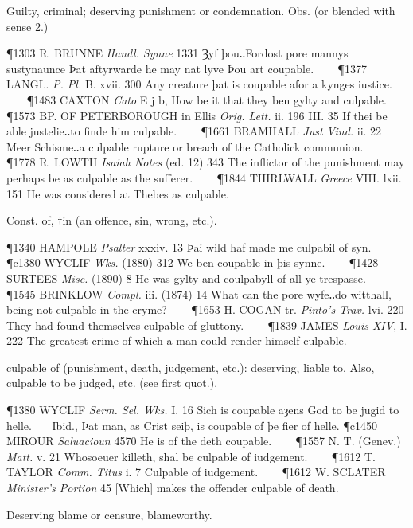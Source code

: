 \begin{description}[wide, labelwidth=!, labelindent=0pt]
\begin{myenumerate}

 Guilty, criminal; deserving punishment or condemnation. Obs. (or blended with sense 2.)

\P 1303 R. BRUNNE  \textit{Handl. Synne} 1331 Ȝyf  þou‥Fordost pore mannys sustynaunce Þat aftyrwarde he may nat lyve Þou art coupable.    
\P 1377 LANGL.  \textit{P. Pl.} B. xvii. 300 Any creature þat is coupable afor a kynges iustice.    
\P 1483 CAXTON  \textit{Cato} E j b, How be it that they ben gylty and culpable.    
\P 1573 BP. OF PETERBOROUGH  in Ellis \textit{Orig. Lett.} ii. 196 III. 35 If thei be able justelie‥to finde him culpable.    
\P 1661 BRAMHALL  \textit{Just Vind.} ii. 22 Meer Schisme‥a culpable rupture or breach of the Catholick communion.    
\P 1778 R. LOWTH  \textit{Isaiah Notes} (ed. 12) 343 The inflictor of the punishment may perhaps be as culpable as the sufferer.    
\P 1844 THIRLWALL  \textit{Greece} VIII. lxii. 151 He was considered at Thebes as culpable.

 Const. of, †in (an offence, sin, wrong, etc.).

\P 1340 HAMPOLE  \textit{Psalter} xxxiv. 13 Þai wild haf made me culpabil of syn.
\P c1380 WYCLIF  \textit{Wks.} (1880) 312 We ben coupable in þis synne.    
\P 1428 SURTEES  \textit{Misc.} (1890) 8 He was gylty and coulpabyll of all ye trespasse.    
\P 1545 BRINKLOW  \textit{Compl.} iii. (1874) 14 What can the pore wyfe‥do witthall, being not culpable in the cryme?    
\P 1653 H. COGAN  tr. \textit{Pinto's Trav.} lvi. 220 They had found themselves culpable of gluttony.    
\P 1839 JAMES  \textit{Louis XIV}, I. 222 The greatest crime of which a man could render himself culpable.

 culpable of (punishment, death, judgement, etc.): deserving, liable to. Also, culpable to be judged, etc. (see first quot.).

\P 1380 WYCLIF  \textit{Serm. Sel. Wks.} I. 16 Sich is coupable aȝens God to be jugid to helle.    Ibid., Þat man, as Crist seiþ, is coupable of þe fier of helle.
\P c1450 MIROUR  \textit{Saluacioun} 4570 He is of the deth coupable.    
\P 1557 N. T. (Genev.)  \textit{Matt.} v. 21 Whosoeuer killeth, shal be culpable of iudgement.    
\P 1612 T. TAYLOR  \textit{Comm. Titus} i. 7 Culpable of iudgement.    
\P 1612 W. SCLATER  \textit{Minister's Portion} 45 [Which] makes the offender culpable of death.

 Deserving blame or censure, blameworthy.


\end{myenumerate}
\end{description}
